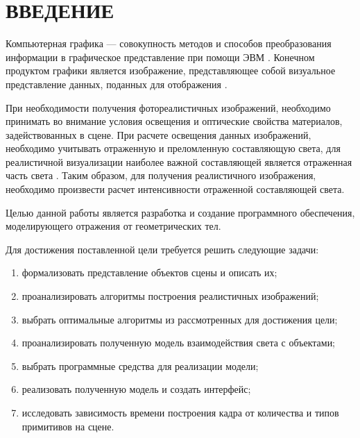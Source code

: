 \chapter*{ВВЕДЕНИЕ}


Компьютерная графика --- совокупность методов и способов преобразования информации в графическое представление при помощи ЭВМ \cite{compgraph_importance}.
Конечном продуктом графики является изображение, представляющее собой визуальное представление данных, поданных для отображения \cite{Rodgers}. 

При необходимости получения фотореалистичных изображений, необходимо принимать во внимание условия освещения и оптические свойства материалов, задействованных в сцене. При расчете освещения данных изображений, необходимо учитывать отраженную  и преломленную составляющую света, для реалистичной визуализации наиболее важной составляющей является отраженная часть света \cite{compgraph_usage,real_images}. Таким образом, для получения реалистичного изображения, необходимо произвести расчет интенсивности отраженной составляющей света.


Целью данной работы является разработка и создание программного обеспечения, моделирующего отражения от геометрических тел.

Для достижения поставленной цели требуется решить следующие задачи:
\begin{enumerate}
	\item формализовать представление объектов сцены и описать их;
	\item проанализировать алгоритмы построения реалистичных изображений;
	\item выбрать оптимальные алгоритмы из рассмотренных для достижения цели;
	\item проанализировать полученную  модель взаимодействия света с объектами;
	\item выбрать программные средства для реализации модели;
	\item реализовать полученную модель и создать интерфейс;
	\item исследовать зависимость времени построения кадра от количества и типов примитивов на сцене.
\end{enumerate}
